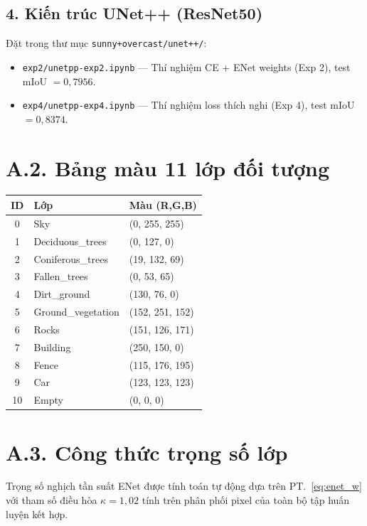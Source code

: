 \subsection*{4. Kiến trúc UNet++ (ResNet50)}
Đặt trong thư mục \texttt{sunny+overcast/unet++/}:
\begin{itemize}[leftmargin=1.4cm]
  \item \texttt{exp2/unetpp-exp2.ipynb} --- Thí nghiệm CE + ENet weights (Exp 2), test mIoU $= 0{,}7956$.
  \item \texttt{exp4/unetpp-exp4.ipynb} --- Thí nghiệm loss thích nghi (Exp 4), test mIoU $= 0{,}8374$.
\end{itemize}

\section*{A.2. Bảng màu 11 lớp đối tượng}
\begin{center}
\small
\begin{tabular}{c l l}
\toprule
\textbf{ID} & \textbf{Lớp} & \textbf{Màu (R,G,B)} \\
\midrule
0  & Sky               & (0, 255, 255) \\
1  & Deciduous\_trees  & (0, 127, 0) \\
2  & Coniferous\_trees & (19, 132, 69) \\
3  & Fallen\_trees     & (0, 53, 65) \\
4  & Dirt\_ground      & (130, 76, 0) \\
5  & Ground\_vegetation& (152, 251, 152) \\
6  & Rocks             & (151, 126, 171) \\
7  & Building          & (250, 150, 0) \\
8  & Fence             & (115, 176, 195) \\
9  & Car               & (123, 123, 123) \\
10 & Empty             & (0, 0, 0) \\
\bottomrule
\end{tabular}
\end{center}

\section*{A.3. Công thức trọng số lớp}
Trọng số nghịch tần suất ENet được tính toán tự động dựa trên PT.~\ref{eq:enet_w} với tham số điều hòa $\kappa = 1{,}02$ tính trên phân phối pixel của toàn bộ tập huấn luyện kết hợp.

